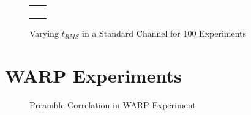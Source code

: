 \begin{figure}[p]
	\centering
	\setlength\figureheight{3cm}
	\setlength{}
	\begin{tabular}{cc}
		\subfloat[MCS 0]{} &
		\subfloat[MCS 1]{} \\
		\subfloat[MCS 2]{} &
		\subfloat[MCS 3]{} \\
		\subfloat[MCS 4]{} &
		\subfloat[MCS 5]{} \\
		\subfloat[MCS 6]{} &
		\subfloat[MCS 7]{} \\
	\end{tabular}
	\caption{Varying $t_{RMS}$ in a Standard Channel for 100 Experiments}
	\label{fig:vary_trms}
\end{figure}




\section{WARP Experiments}

\begin{figure}[H]
	\centering
	\setlength\figureheight{5cm}
	\setlength{}
	
	\caption{Preamble Correlation in WARP Experiment}
	\label{fig:warp_preamble_corr}
\end{figure}
